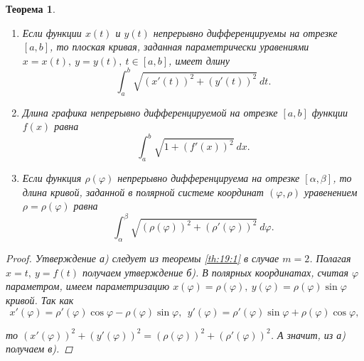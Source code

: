 \documentclass[12pt]{report}
\numberwithin{equation}{section}
\newtheorem{theorem}{Теорема}[section]
\begin{document}
\begin{theorem} \label{th:20:1}
~
\begin{enumerate}
\item[а)] Если функции $x(t)$ и $y(t)$ непрерывно дифференцируемы на отрезке $[a,b]$, то плоская кривая, заданная параметрически уравениями $x = x(t),~y = y(t),~t\in [a,b]$, имеет длину
\[ \int_a^b \sqrt{(x'(t))^2 + (y'(t))^2}~dt.\]

\item[б)] Длина графика непрерывно дифференцируемой на отрезке $[a,b]$ функции $f(x)$ равна
\[ \int_a^b \sqrt{1 + (f'(x))^2}~dx.\]

\item[в)] Если функция $\rho(\varphi)$ непрерывно дифференцируема на отрезке $[\alpha, \beta]$, то длина кривой, заданной в полярной системе координат $(\varphi, \rho)$ уравенением $\rho = \rho(\varphi)$ равна
\[ \int_{\alpha}^{\beta} \sqrt{(\rho(\varphi))^2 + (\rho'(\varphi))^2}~d\varphi.\]
\end{enumerate}

\begin{proof}
Утверждение а) следует из теоремы \ref{th:19:1} в случае $m = 2$. Полагая $x = t,~y = f(t)$ получаем утверждение б). В полярных координатах, считая $\varphi$ параметром, имеем параметризацию $x(\varphi) = \rho(\varphi),~ y(\varphi) = \rho(\varphi)\sin \varphi$ кривой. Так как
\[ x'(\varphi) = \rho'(\varphi)\cos\varphi - \rho(\varphi)\sin\varphi,~~ y'(\varphi) = \rho'(\varphi)\sin\varphi + \rho(\varphi)\cos\varphi,\]

то $(x'(\varphi))^2 + (y'(\varphi))^2 = (\rho(\varphi))^2 + (\rho'(\varphi))^2$. А значит, из а) получаем в).
\end{proof}
\end{theorem}
\end{document}
